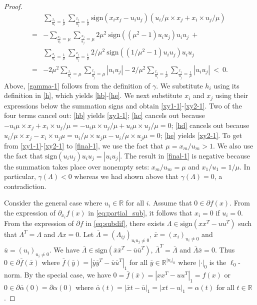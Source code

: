 \documentclass[12pt]{article}
\theoremstyle{definition}
\theoremstyle{plain}
\begin{document}
\begin{proof}
\begin{subequations}
\begin{align}
        & \sum\limits_{\frac{x_i}{u_i} =\frac{1}{\mu}} \sum\limits_{\frac{x_j}{u_j} =\frac{1}{\mu}} \mathrm{sign}(x_ix_j-u_iu_j)(u_i/\mu \times x_j + x_i \times u_j/\mu)\label{he} \\
        = &-\sum\limits_{\frac{x_i}{u_i} = \mu} \sum\limits_{\frac{x_j}{u_j} = \mu} 2\mu^2~\mathrm{sign}((\mu^2-1)u_iu_j)u_iu_j ~ + \label{xy1-1} \\
        & \sum\limits_{\frac{x_i}{u_i} =\frac{1}{\mu}} \sum\limits_{\frac{x_j}{u_j} =\frac{1}{\mu}}2/\mu^2~\mathrm{sign}((1/\mu^2 - 1)u_iu_j)u_iu_j \label{xy2-1}\\
        = & - 2\mu^2 \sum\limits_{\frac{x_i}{u_i} = \mu} \sum\limits_{\frac{x_j}{u_j} = \mu} |u_i u_j| -2/\mu^2 \sum\limits_{\frac{x_i}{u_i} =\frac{1}{\mu}} \sum\limits_{\frac{x_j}{u_j} = \frac{1}{\mu}} |u_iu_j| ~<~ 0. \label{final-1}
        \end{align}
\end{subequations}
Above, \eqref{gamma-1} follows from the definition of $\gamma$. We substitute $h_i$ using its definition in \eqref{h}, which yields \eqref{hb}-\eqref{he}. We next substitute $x_i$ and $x_j$ using their expressions below the summation signs and obtain \eqref{xy1-1}-\eqref{xy2-1}. Two of the four terms cancel out: \eqref{hb} yields \eqref{xy1-1};  \eqref{hc} cancels out because $-u_i \mu \times x_j + x_i \times u_j/\mu = -u_i \mu \times u_j/\mu + u_i \mu \times u_j/\mu = 0$; \eqref{hd} cancels out because $u_i/\mu \times x_j - x_i \times u_j\mu = u_i/\mu \times u_j \mu - u_i/\mu \times u_j\mu = 0$; \eqref{he} yields \eqref{xy2-1}. To get from \eqref{xy1-1}-\eqref{xy2-1} to \eqref{final-1}, we use the fact that $\mu = x_{m}/u_{m}>1$. We also use the fact that $\mathrm{sign}(u_iu_j)u_iu_j = |u_iu_j|$. The result in \eqref{final-1} is negative because the summation takes place over nonempty sets: $x_{m}/u_{m} = \mu$ and $x_{1}/u_{1} = 1/\mu$. In particular, $\gamma(\Lambda) < 0$ whereas we had shown above that $\gamma(\Lambda) = 0$, a contradiction. 

Consider the general case where $u_i \in \mathbb{R}$ for all $i$. Assume that $0 \in \partial f(x)$. From the expression of $\partial_{x_i} f(x)$ in \eqref{eq:partial_sub}, it follows that $x_i = 0$ if $u_i = 0$. From the expression of $\partial f$ in \eqref{eq:subdif}, there exists $\Lambda \in \mathrm{sign}(xx^T-uu^T)$ such that $\Lambda^T = \Lambda$ and $\Lambda x = 0$. Let $\bar{\Lambda} = (\Lambda_{ij})_{u_iu_j\neq 0}$, $\bar{x} = (x_i)_{u_i \neq 0}$ and $\bar{u} = (u_i)_{u_i \neq 0}$. We have $\bar{\Lambda} \in \mathrm{sign}(\bar{x}\bar{x}^T-\bar{u}\bar{u}^T)$, $\bar{\Lambda}^T = \bar{\Lambda}$ and $\bar{\Lambda} \bar{x} = 0$. Thus $0 \in \partial \bar{f}(\bar{x})$ where $\bar{f}(\bar{y}) = |\bar{y}\bar{y}^T-\bar{u}\bar{u}^T|_1$ for all $\bar{y} \in \mathbb{R}^{|u_i|_0}$ where $|\cdot|_0$ is the $\ell_0$-norm. By the special case, we have $0 = \bar{f}(\bar{x}) = |xx^T-uu^T|_1 = f(x)$ or $0 \in \partial \bar{\alpha}(0) = \partial \alpha (0)$ where $\bar{\alpha}(t) = |\bar{x}t - \bar{u}|_1 = |xt - u|_1 = \alpha(t)$ for all $t\in \mathbb{R}$.
\end{proof}
\end{document}
